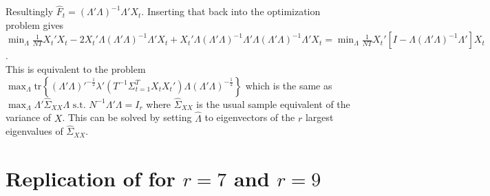 \documentclass[11pt]{article}
\begin{document}
Resultingly $\hat F_t = (\Lambda' \Lambda)^{-1} \Lambda' X_t$. Inserting that back into the optimization problem gives $\min_\Lambda \frac{1}{NT} X_t'X_t - 2X_t' \Lambda (\Lambda' \Lambda)^{-1} \Lambda'X_t + X_t' \Lambda (\Lambda' \Lambda)^{-1} \Lambda' \Lambda (\Lambda' \Lambda)^{-1} \Lambda'X_t = \min_\Lambda \frac{1}{NT} X_t' [I - \Lambda (\Lambda' \Lambda)^{-1} \Lambda']X_t$. \\
This is equivalent to the problem $\max_\Lambda \text{tr}\left\{(\Lambda'\Lambda)'^{-\frac{1}{2}}\lambda'(T^{-1} \Sigma_{t=1}^T X_tX_t') \Lambda (\Lambda' \Lambda)^{-\frac{1}{2}}\right\}$ which is the same as $\max_\Lambda \Lambda' \hat \Sigma_{XX} \Lambda \text{ s.t. } N^{-1} \Lambda' \Lambda = I_r$ where $\hat \Sigma_{XX}$ is the usual sample equivalent of the variance of $X$. This can be solved by setting $\hat \Lambda$ to eigenvectors of the $r$ largest eigenvalues of $\hat \Sigma_{XX}$.


\newpage
\section{Replication of \citet{bai2002determining} for $r=7$ and $r=9$}
\end{document}
